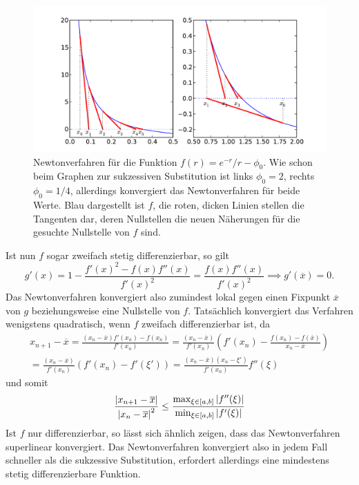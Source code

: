 \begin{figure}
  \centering
  \includegraphics[width=\textwidth]{plots/newton}
  \caption{Newtonverfahren für die Funktion $f(r) = e^{-r}/r -
    \phi_0$. Wie schon beim Graphen zur sukzessiven Substitution ist
    links $\phi_0=2$, rechts $\phi_0=1/4$, allerdings konvergiert das
    Newtonverfahren für beide Werte. Blau dargestellt ist $f$, die
    roten, dicken Linien stellen die Tangenten dar, deren Nullstellen
    die neuen Näherungen für die gesuchte Nullstelle von $f$ sind.}
  \label{fig:newton}
\end{figure}

Ist nun $f$ sogar zweifach stetig differenzierbar, so gilt
\begin{equation}
  g'(x) = 1 - \frac{f'(x)^2 - f(x)f''(x)}{f'(x)^2} =
  \frac{f(x)f''(x)}{f'(x)^2} \implies g'(\overline{x}) = 0.
\end{equation}
Das Newtonverfahren konvergiert also zumindest lokal gegen einen
Fixpunkt $\overline{x}$ von $g$ beziehungsweise eine Nullstelle von
$f$. Tatsächlich konvergiert das Verfahren wenigstens quadratisch,
wenn $f$ zweifach differenzierbar ist, da
\begin{align}
  x_{n+1} - \overline{x} = \frac{(x_n - \overline{x})f'(x_n) -
    f(x_n)}{f'(x_n)}
  = \frac{(x_n - \overline{x})}{f'(x_n)}\left( f'(x_n) -
    \frac{f(x_n) - f(\overline{x})}{x_n - \overline{x}}\right)\nonumber\\
  = \frac{(x_n - \overline{x})}{f'(x_n)}\left( f'(x_n) -
    f'(\xi')\right)
  = \frac{(x_n - \overline{x})(x_n - \xi')}{f'(x_n)}f''(\xi)
\end{align}
und somit
\begin{equation}
  \frac{\left\lvert{x_{n+1} - \overline{x}}\right\rvert}{\left\lvert{x_n - \overline{x}}\right\rvert^2}
  \le \frac{\max_{\xi\in [a,b]} \left\lvert{f''(\xi)}\right\rvert}{\min_{\xi\in [a,b]} \left\lvert{f'(\xi)}\right\rvert}
\end{equation}
Ist $f$ nur differenzierbar, so lässt sich ähnlich zeigen, dass das
Newtonverfahren superlinear konvergiert. Das Newtonverfahren
konvergiert also in jedem Fall schneller als die sukzessive
Substitution, erfordert allerdings eine mindestens stetig
differenzierbare Funktion.


